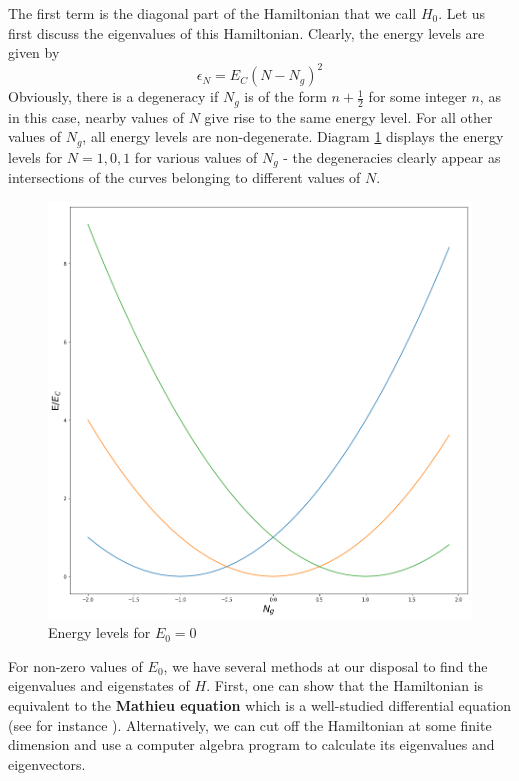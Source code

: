 \documentclass[a4paper, draft]{article}
\theoremstyle{own}
\theoremstyle{remark}
\begin{document}
The first term is the diagonal part of the Hamiltonian that we call $H_0$. Let us first discuss the eigenvalues of this Hamiltonian. Clearly, the energy levels are given by
$$
\epsilon_N = E_C (N - N_g)^2 
$$
Obviously, there is a degeneracy if $N_g$ is of the form $n + \frac{1}{2}$ for some integer $n$, as in this case, nearby values of $N$ give rise to the same energy level. For all other values of $N_g$, all energy levels are non-degenerate. Diagram \ref{fig:CooperPairBoxEnergyLevels_unperturbed} displays the energy levels for $N=1,0,1$ for various values of $N_g$ - the degeneracies clearly appear as intersections of the curves belonging to different values of $N$.

\begin{figure}[ht]
\centering
\includegraphics[width=0.7\linewidth]{images/CooperPairBoxEnergyLevels_unperturbed}
\caption[Energy levels for $E_0=0$]{Energy levels for $E_0=0$}
\label{fig:CooperPairBoxEnergyLevels_unperturbed}
\end{figure}

For non-zero values of $E_0$, we have several methods at our disposal to find the eigenvalues and eigenstates of $H$. First, one can show that the Hamiltonian is equivalent to the {\bf Mathieu equation} which is a well-studied differential equation (see for instance \cite{DevoretWallraffMartinis}). Alternatively, we can cut off the Hamiltonian at some finite dimension and use a computer algebra program to calculate its eigenvalues and eigenvectors.
\end{document}
